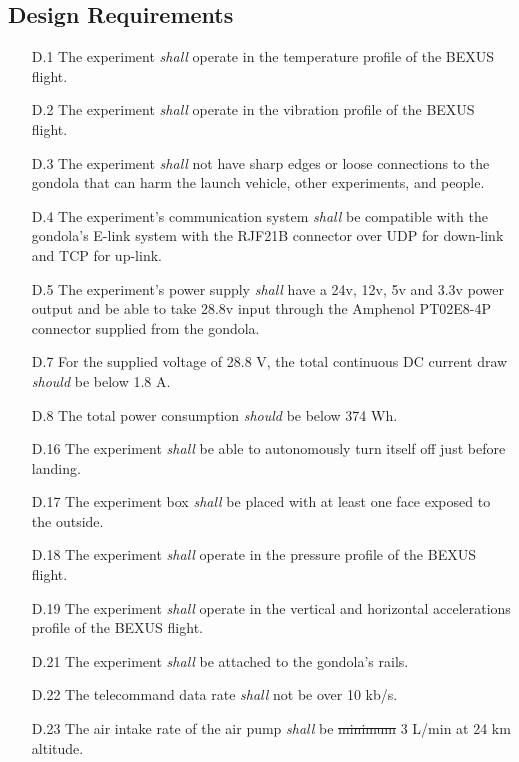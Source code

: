 \documentclass[a4paper,12pt,oneside]{article} %
\providecommand{\DIFaddtex}[1]{{\protect\color{blue}\uwave{#1}}} %
\providecommand{\DIFdeltex}[1]{{\protect\color{red}\sout{#1}}}                      %
\providecommand{\DIFaddbegin}{} %
\providecommand{\DIFaddend}{} %
\providecommand{\DIFdelbegin}{} %
\providecommand{\DIFdelend}{} %
\providecommand{\DIFadd}[1]{\texorpdfstring{\DIFaddtex{#1}}{#1}} %
\providecommand{\DIFdel}[1]{\texorpdfstring{\DIFdeltex{#1}}{}} %
\newcommand{\DIFscaledelfig}{0.5}
\newlength{\DIFdelgraphicswidth} %
\newlength{\DIFdelgraphicsheight} %
\newcommand{\DIFaddincludegraphics}[2][]{{\color{blue}\fbox{\DIFOincludegraphics[#1]{#2}}}} %
\newcommand{\DIFdelincludegraphics}[2][]{%
\sbox{\DIFdelgraphicsbox}{\DIFOincludegraphics[#1]{#2}}%
\settoboxwidth{\DIFdelgraphicswidth}{\DIFdelgraphicsbox} %
\settoboxtotalheight{\DIFdelgraphicsheight}{\DIFdelgraphicsbox} %
\scalebox{\DIFscaledelfig}{%
\parbox[b]{\DIFdelgraphicswidth}{\usebox{\DIFdelgraphicsbox}\\[-\baselineskip] \rule{\DIFdelgraphicswidth}{0em}}\llap{\resizebox{\DIFdelgraphicswidth}{\DIFdelgraphicsheight}{%
\setlength{\unitlength}{\DIFdelgraphicswidth}%
\begin{picture}(1,1)%
\thicklines\linethickness{2pt} %
{\color[rgb]{1,0,0}\put(0,0){\framebox(1,1){}}}%
{\color[rgb]{1,0,0}\put(0,0){\line( 1,1){1}}}%
{\color[rgb]{1,0,0}\put(0,1){\line(1,-1){1}}}%
\end{picture}%
}\hspace*{3pt}}} %
} %
\DeclareRobustCommand{\DIFaddbegin}{\DIFOaddbegin \let\includegraphics\DIFaddincludegraphics} %
\DeclareRobustCommand{\DIFaddend}{\DIFOaddend \let\includegraphics\DIFOincludegraphics} %
\DeclareRobustCommand{\DIFdelbegin}{\DIFOdelbegin \let\includegraphics\DIFdelincludegraphics} %
\DeclareRobustCommand{\DIFdelend}{\DIFOaddend \let\includegraphics\DIFOincludegraphics} %
\begin{document}
\subsection{Design Requirements}

\begin{enumerate}
    \item[D.1] The experiment \textit{shall} operate in the temperature profile of the BEXUS flight\cite{BexusManual}.
    \item[D.2] The experiment \textit{shall} operate in the vibration profile of the BEXUS flight\cite{BexusManual}.
    \item[D.3] The experiment \textit{shall} not have sharp edges or loose connections to the gondola that can harm the launch vehicle, other experiments, and people.%
    \item[D.4] The experiment's communication system \textit{shall} be compatible with the gondola's E-link system with the RJF21B connector over UDP for down-link and TCP for up-link.
    \item[D.5] The experiment's power supply \textit{shall} have a 24v, 12v, 5v and 3.3v power output and be able to take 28.8v input through the Amphenol PT02E8-4P connector supplied from the gondola. 
    \item[D.7] For the supplied voltage of 28.8 V, the total continuous DC current draw \textit{should} be below 1.8 A.
    \item[D.8] The total power consumption \textit{should} be below 374 Wh.
    \item[D.16] The experiment \textit{shall} be able to autonomously turn itself off just before landing.
    \item[D.17] The experiment box \textit{shall} be placed with at least one face exposed to the outside.
    \item[D.18] The experiment \textit{shall} operate in the pressure profile of the BEXUS flight\cite{BexusManual}.
    \item[D.19] The experiment \textit{shall} operate in the vertical and horizontal accelerations profile of the BEXUS flight\cite{BexusManual}.
    \item[D.21] The experiment \textit{shall} be attached to the gondola's rails.
    \item[D.22] The telecommand data rate \textit{shall} not be over 10 kb/s.
    \item[D.23] The air intake rate of the air pump \textit{shall} be \DIFdelbegin \DIFdel{minimum }\DIFdelend \DIFaddbegin \DIFadd{equivalent to a minimum of }\DIFaddend 3 L/min at 24 km altitude.

\end{enumerate}
\end{document}
